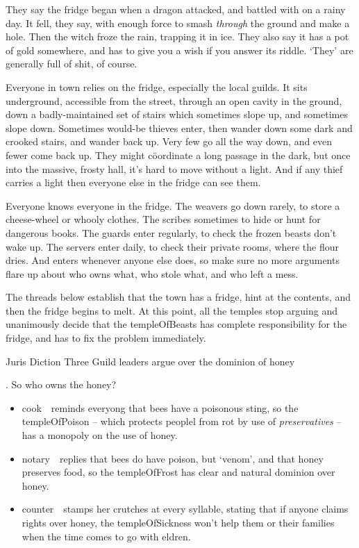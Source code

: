 
\begin{exampletext}
  \noindent
  They say the fridge began when a dragon attacked, and battled with  on a rainy day.
  It fell, they say, with enough force to smash \emph{through} the ground and make a hole.
  Then the \gls{witch} froze the rain, trapping it in ice.
  They also say it has a pot of gold somewhere, and has to give you a wish if you answer its riddle.
  `They' are generally full of shit, of course.
\end{exampletext}

Everyone in town relies on the fridge, especially the local guilds.
It sits underground, accessible from the street, through an open cavity in the ground, down a badly-maintained set of stairs which sometimes slope up, and sometimes slope down.
Sometimes would-be thieves enter, then wander down some dark and crooked stairs, and wander back up.
Very few go all the way down, and even fewer come back up.
They might c\"oordinate a long passage in the dark, but once into the massive, frosty hall, it's hard to move without a light.
And if any thief carries a light then everyone else in the fridge can see them.

Everyone knows everyone in the fridge.
The \glspl{weaver} go down rarely, to store a cheese-wheel or whooly clothes.
The \glspl{scribe} sometimes to hide or hunt for dangerous books.
The \glspl{guard} enter regularly, to check the frozen beasts don't wake up.
The \glspl{server} enter daily, to check their private rooms, where the flour dries.
And  enters whenever anyone else does, so make sure no more arguments flare up about who owns what, who stole what, and who left a mess.

The \glspl{thread} below establish that the town has a fridge, hint at the contents, and then the fridge begins to melt.
At this point, all the \glspl{temple} stop arguing and unanimously decide that the \gls{templeOfBeasts} has complete responsibility for the fridge, and has to fix the problem immediately.

{Juris Diction}%
{Three Guild leaders argue over the dominion of honey}%

.
So who owns the honey?

\begin{itemize}
  \item
  \Gls{cook}~\composeHumanName\ reminds everyong that bees have a poisonous sting, so the \gls{templeOfPoison} -- which protects peoplel from rot by use of \emph{preservatives} -- has a monopoly on the use of honey.
  \item
  \Gls{notary}~\composeHumanName\ replies that bees do have poison, but `venom', and that honey preserves food, so the \gls{templeOfFrost} has clear and natural dominion over honey.
  \item
  \Gls{counter}~\composeHumanName\ stamps her crutches at every syllable, stating that if anyone claims rights over honey, the \gls{templeOfSickness} won't help them or their families when the time comes to go with \gls{eldren}.
\end{itemize}


